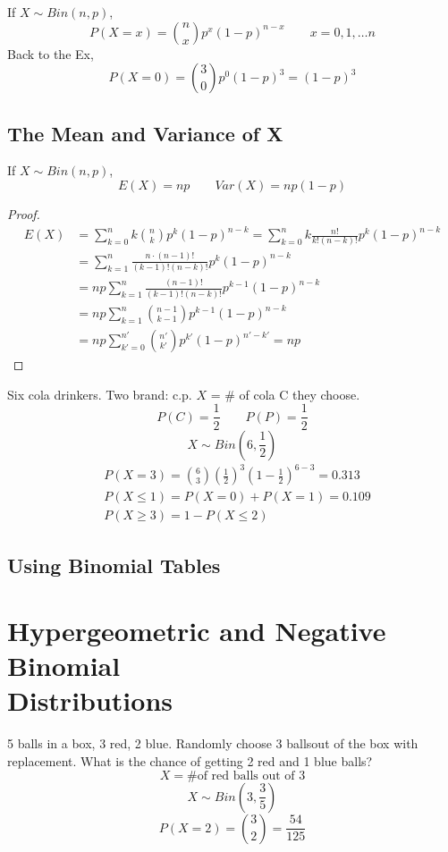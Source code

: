 If $X \sim Bin(n,p)$,
\[P(X=x)=\binom nx p^x (1-p)^{n-x}  \qquad x=0,1,\dots n\]
Back to the Ex, \[P(X=0)=\binom 30 p^0 (1-p)^3=(1-p)^3\]

\subsection{The Mean and Variance of X}
\begin{prop}
If $X \sim Bin(n,p)$,
\[E(X)=np \qquad Var(X)=np(1-p)\]
\begin{proof}
\begin{align*}
E(X)&=\sum_{k=0}^{n} k\binom nk p^k (1-p)^{n-k} =\sum_{k=0}^{n} k \frac{n!}{k!(n-k)!} p^k (1-p)^{n-k}\\
&=\sum_{k=1}^{n}  \frac{n \cdot(n-1)!}{(k-1)!(n-k)!} p^k (1-p)^{n-k} \\
&=np \sum_{k=1}^{n}  \frac{(n-1)!}{(k-1)!(n-k)!} p^{k-1} (1-p)^{n-k} \\
&=np \sum_{k=1}^{n}  \binom {n-1}{k-1} p^{k-1} (1-p)^{n-k}		\\
&=np \sum_{k'=0}^{n'}  \binom {n'}{k'} p^{k'} (1-p)^{n'-k'}=np
\end{align*}
\end{proof}
\end{prop}

\begin{exmp}
Six cola drinkers. Two brand: c.p. $X$ = \# of cola C they choose.
\[P(C)=\frac{1}{2} \qquad P(P)=\frac{1}{2}\]
\[X \sim Bin \left(6,\frac{1}{2} \right)\]
\begin{align*}
&P(X=3)=\binom 63 \left(\frac{1}{2}\right)^3	\left(1-\frac{1}{2}\right)^{6-3}=0.313 \\
&P(X \leq 1)=P(X=0)+P(X=1)=0.109 \\
&P(X \geq 3)=1-P(X \leq 2)
\end{align*}
\end{exmp}

\subsection{Using Binomial Tables}

\section{Hypergeometric and Negative Binomial\\ Distributions}
\begin{exmp}
5 balls in a box, 3 red, 2 blue. Randomly choose 3 ballsout of the box with replacement. What is the chance of getting 2 red and 1 blue balls?
\[X= \text{\# of red balls out of 3}\]
\[X \sim  Bin\left(3,\frac{3}{5}\right)\]
\[P(X=2)=\binom 32 =\frac{54}{125}\]
\end{exmp}

